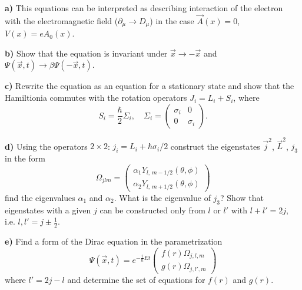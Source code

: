 \documentclass[a4paper,11pt]{article}
\begin{document}
\begin{enumerate}
  \textbf{a)} This equations can be interpreted as describing
  interaction of the electron with the electromagnetic field
  ($\partial_{ \mu } \to D_{ \mu }$) in the case $\vec{ A }( x ) = 0$,
  $V( x ) = e A_{ 0 }( x )$.

  \textbf{b)} Show that the equation is invariant under
  $\vec{ x } \to -\vec{ x }$ and
  $\Psi( \vec{ x }, t ) \to \beta \Psi( -\vec{ x }, t )$.

  \textbf{c)} Rewrite the equation as an equation for a stationary
  state and show that the Hamiltionia commutes with the rotation
  operators $J_{ i } = L_{ i } + S_{ i }$, where
  \begin{equation}
    \label{eq:26}
    S_{ i } = \frac{ \hbar }{ 2 } \Sigma_{ i }, \quad
    \Sigma_{ i }
    =
    \begin{pmatrix}
      \sigma_{ i } & 0 \\
      0 & \sigma_{ i }
    \end{pmatrix}.
  \end{equation}

  \textbf{d)} Using the operators $2 \times 2$:
  $j_{ i } = L_{ i } + \hbar \sigma_{ i } / 2$ construct the
  eigenstates $\vec{ j }^{ 2 }$, $\vec{ L }^{ 2 }$, $j_{ 3 }$ in the
  form
  \begin{equation}
    \label{eq:27}
    \Omega_{ j l m } =
    \begin{pmatrix}
      \alpha_{ 1 } Y_{ l, \, m - 1/2 }( \theta, \phi ) \\
      \alpha_{ 2 } Y_{ l, \, m + 1/2 }( \theta, \phi )
    \end{pmatrix}
  \end{equation}
  find the eigenvalues $\alpha_{ 1 }$ and $\alpha_{ 2 }$. What is the eigenvalue
  of $j_{ 3 }$? Show that eigenstates with a given $j$ can be
  constructed only from $l$ or $l'$ with $l + l' = 2j$, i.e.
  $l, l' = j \pm \frac{ 1 }{ 2 }$.

  \textbf{e)} Find a form of the Dirac equation in the parametrization
  \begin{equation}
    \label{eq:28}
    \Psi( \vec{ x }, t ) =
    e^{ -\frac{ i }{ \hbar } E t }
    \begin{pmatrix}
      f( r ) \Omega_{ j, l, m } \\
      g( r ) \Omega_{ j, l', m }
    \end{pmatrix}
  \end{equation}
  where $l' = 2j - l$ and determine the set of equations for $f( r )$
  and $g( r )$.


\end{enumerate}
\end{document}
